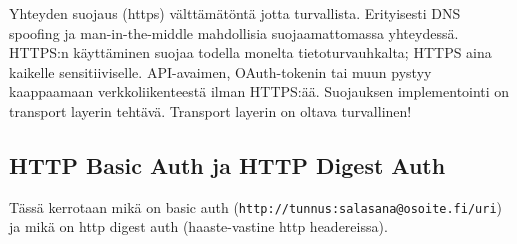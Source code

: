 \documentclass[finnish,gradu]{tktltiki}
\begin{document}
  Yhteyden suojaus (https) välttämätöntä jotta turvallista. Erityisesti DNS spoofing ja man-in-the-middle mahdollisia suojaamattomassa yhteydessä.
  HTTPS:n käyttäminen suojaa todella monelta tietoturvauhkalta;
  HTTPS aina kaikelle sensitiiviselle. API-avaimen, OAuth-tokenin tai muun pystyy kaappaamaan verkkoliikenteestä ilman HTTPS:ää.  Suojauksen implementointi on transport layerin tehtävä. Transport layerin on oltava turvallinen!





  \subsection{HTTP Basic Auth ja HTTP Digest Auth} %
  \label{sub:http_basic_auth_ja_http_digest_auth}
  Tässä kerrotaan mikä on basic auth (\verb!http://tunnus:salasana@osoite.fi/uri!) ja mikä on http digest auth (haaste-vastine http headereissa).





\end{document}
